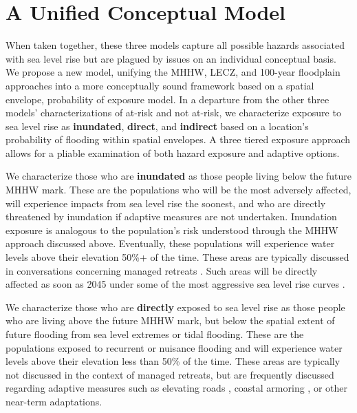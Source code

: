 \documentclass[12pt,]{article}
\begin{document}
\section{A Unified Conceptual Model}\label{a-unified-conceptual-model}

When taken together, these three models capture all possible hazards
associated with sea level rise but are plagued by issues on an
individual conceptual basis. We propose a new model, unifying the MHHW,
LECZ, and 100-year floodplain approaches into a more conceptually sound
framework based on a spatial envelope, probability of exposure model. In
a departure from the other three models' characterizations of at-risk
and not at-risk, we characterize exposure to sea level rise as
\textbf{inundated}, \textbf{direct}, and \textbf{indirect} based on a
location's probability of flooding within spatial envelopes. A three
tiered exposure approach allows for a pliable examination of both hazard
exposure and adaptive options.

We characterize those who are \textbf{inundated} as those people living
below the future MHHW mark. These are the populations who will be the
most adversely affected, will experience impacts from sea level rise the
soonest, and who are directly threatened by inundation if adaptive
measures are not undertaken. Inundation exposure is analogous to the
population's risk understood through the MHHW approach discussed above.
Eventually, these populations will experience water levels above their
elevation 50\%+ of the time. These areas are typically discussed in
conversations concerning managed retreats
\citep{huntington2012towards, hino2017managed}. Such areas will be
directly affected as soon as 2045 under some of the most aggressive sea
level rise curves
\citetext{\citealp{deconto2016contribution}; \citealp[@][]{sweet2017global}}.

We characterize those who are \textbf{directly} exposed to sea level
rise as those people who are living above the future MHHW mark, but
below the spatial extent of future flooding from sea level extremes or
tidal flooding. These are the populations exposed to recurrent or
nuisance flooding \citep{chang2010potential, dahl2017sea} and will
experience water levels above their elevation less than 50\% of the
time. These areas are typically not discussed in the context of managed
retreats, but are frequently discussed regarding adaptive measures such
as elevating roads \citep{titus2009state}, coastal armoring
\citep{jin2015shoreline}, or other near-term adaptations.
\end{document}
